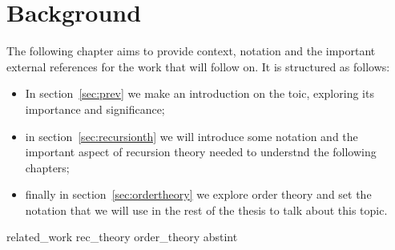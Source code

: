 \chapter{Background}

The following chapter aims to provide context, notation and the
important external references for the work that will follow on. It is
structured as follows:

\begin{itemize}
\item In section~\ref{sec:prev} we make an introduction on the toic,
  exploring its importance and significance;
\item in section~\ref{sec:recursionth} we will introduce some notation
  and the important aspect of recursion theory needed to understnd the
  following chapters;
\item finally in section~\ref{sec:ordertheory} we explore order theory
  and set the notation that we will use in the rest of the thesis to
  talk about this topic.
\end{itemize}

{related_work}
{rec_theory}
{order_theory}
{abstint}
